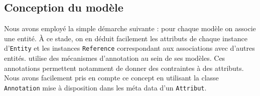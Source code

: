 \subsection{Conception du modèle}
Nous avons employé la simple démarche suivante : pour chaque modèle on associe une entité. À ce stade, on en déduit facilement les attributs de chaque instance d'\verb+Entity+ et les instances \verb+Reference+ correspondant aux associations avec d'autres entités. \kwplay{} utilise des mécanismes d'annotation au sein de ses modèles. Ces annotations permettent notamment de donner des contraintes à des attributs. Nous avons facilement pris en compte ce concept en utilisant la classe \verb+Annotation+ mise à disposition dans les méta data d'un \verb+Attribut+.
\clearpage


